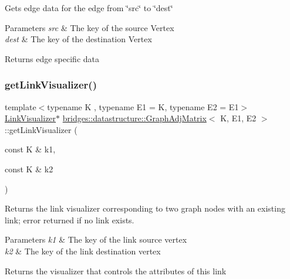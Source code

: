 Gets edge data for the edge from \char`\"{}src\char`\"{} to \char`\"{}dest\char`\"{}


\begin{DoxyParams}{Parameters}
{\em src} & The key of the source Vertex \\
\hline
{\em dest} & The key of the destination Vertex\\
\hline
\end{DoxyParams}
\begin{DoxyReturn}{Returns}
edge specific data 
\end{DoxyReturn}
\mbox{\label{classbridges_1_1datastructure_1_1_graph_adj_matrix_ab41a062af77b11e5cc034f7c21d12421}} 
\subsubsection{\texorpdfstring{get\+Link\+Visualizer()}{getLinkVisualizer()}}
{\footnotesize\ttfamily template$<$typename K , typename E1  = K, typename E2  = E1$>$ \\
\hyperlink{classbridges_1_1datastructure_1_1_link_visualizer}{Link\+Visualizer}$\ast$ \hyperlink{classbridges_1_1datastructure_1_1_graph_adj_matrix}{bridges\+::datastructure\+::\+Graph\+Adj\+Matrix}$<$ K, E1, E2 $>$\+::get\+Link\+Visualizer (\begin{DoxyParamCaption}\item[{const K \&}]{k1,  }\item[{const K \&}]{k2 }\end{DoxyParamCaption})\hspace{0.3cm}{\ttfamily [inline]}}

Returns the link visualizer corresponding to two graph nodes with an existing link; error returned if no link exists.


\begin{DoxyParams}{Parameters}
{\em k1} & The key of the link source vertex \\
\hline
{\em k2} & The key of the link destination vertex\\
\hline
\end{DoxyParams}
\begin{DoxyReturn}{Returns}
the visualizer that controls the attributes of this link 
\end{DoxyReturn}
\mbox{\label{classbridges_1_1datastructure_1_1_graph_adj_matrix_aaf5c1ae5267b7ff4c8fcc861221ff2e8}} 
